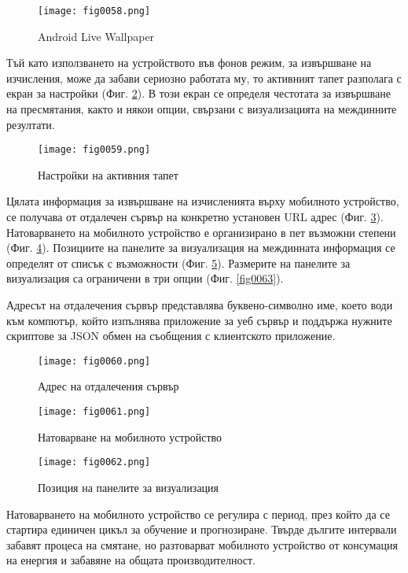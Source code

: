 \begin{figure}[H]
  \centering
  \texttt{[image: fig0058.png]}
  \caption{Android Live Wallpaper}
\label{fig0058}
\end{figure}

Тъй като използването на устройството във фонов режим, за извършване на изчисления, може да забави сериозно работата му, то активният тапет разполага с екран за настройки (Фиг. \ref{fig0059}). В този екран се определя честотата за извършване на пресмятания, както и някои опции, свързани с визуализацията на междинните резултати. 

\begin{figure}[H]
  \centering
  \texttt{[image: fig0059.png]}
  \caption{Настройки на активния тапет}
\label{fig0059}
\end{figure}

Цялата информация за извършване на изчисленията върху мобилното устройство, се получава от отдалечен сървър на конкретно установен URL адрес (Фиг. \ref{fig0060}). Натоварването на мобилното устройство е организирано в пет възможни степени (Фиг. \ref{fig0061}). Позициите на панелите за визуализация на междинната информация се определят от списък с възможности (Фиг. \ref{fig0062}). Размерите на панелите за визуализация са ограничени в три опции (Фиг. \ref{fig0063}).

Адресът на отдалечения сървър представлява буквено-символно име, което води към компютър, който изпълнява приложение за уеб сървър и поддържа нужните скриптове за JSON обмен на съобщения с клиентското приложение.

\begin{figure}[H]
  \centering
  \texttt{[image: fig0060.png]}
  \caption{Адрес на отдалечения сървър}
\label{fig0060}
\end{figure}

\begin{figure}[H]
  \centering
  \texttt{[image: fig0061.png]}
  \caption{Натоварване на мобилното устройство}
\label{fig0061}
\end{figure}

\begin{figure}[H]
  \centering
  \texttt{[image: fig0062.png]}
  \caption{Позиция на панелите за визуализация}
\label{fig0062}
\end{figure}


Натоварването на мобилното устройство се регулира с период, през който да се стартира единичен цикъл за обучение и прогнозиране. Твърде дългите интервали забавят процеса на смятане, но разтоварват мобилното устройство от консумация на енергия и забавяне на общата производителност.

